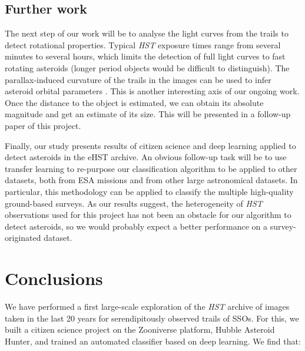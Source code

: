 \documentclass{aa}
\begin{document}
  
\subsection{Further work}
\label{further_work}

The next step of our work will be to analyse the light curves from the trails to detect rotational properties. Typical \textit{HST} exposure times range from several minutes to several hours, which limits the detection of full light curves to fast rotating asteroids (longer period objects would be difficult to distinguish). The parallax-induced curvature of the trails in the images can be used to infer asteroid orbital parameters \citep{Evans1998}. This is another interesting axis of our ongoing work. Once the distance to the object is estimated, we can obtain its absolute magnitude and get an estimate of its size. This will be presented in a follow-up paper of this project.

Finally, our study presents results of citizen science and deep learning applied to detect asteroids in the eHST archive. An obvious follow-up task will be to use transfer learning to re-purpose our classification algorithm to be applied to other datasets, both from ESA missions and from other large astronomical datasets. In particular, this methodology can be applied to classify the multiple high-quality ground-based surveys. As our results suggest, the heterogeneity of \textit{HST} observations used for this project has not been an obstacle for our algorithm to detect asteroids, so we would probably expect a better performance on a survey-originated dataset. 


\section{Conclusions}
\label{conclusionssection}

We have performed a first large-scale exploration of the \textit{HST} archive of images taken in the last 20 years for serendipitously observed trails of SSOs. For this, we built a citizen science project on the Zooniverse platform, Hubble Asteroid Hunter, and trained an automated classifier based on deep learning. We find that:
\end{document}
